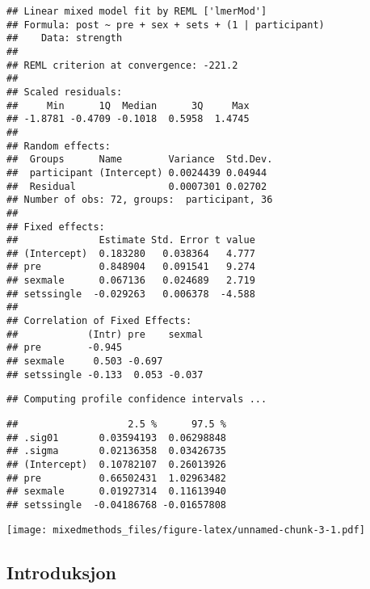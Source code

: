\documentclass[
]{article}
\begin{document}
\begin{verbatim}
## Linear mixed model fit by REML ['lmerMod']
## Formula: post ~ pre + sex + sets + (1 | participant)
##    Data: strength
## 
## REML criterion at convergence: -221.2
## 
## Scaled residuals: 
##     Min      1Q  Median      3Q     Max 
## -1.8781 -0.4709 -0.1018  0.5958  1.4745 
## 
## Random effects:
##  Groups      Name        Variance  Std.Dev.
##  participant (Intercept) 0.0024439 0.04944 
##  Residual                0.0007301 0.02702 
## Number of obs: 72, groups:  participant, 36
## 
## Fixed effects:
##              Estimate Std. Error t value
## (Intercept)  0.183280   0.038364   4.777
## pre          0.848904   0.091541   9.274
## sexmale      0.067136   0.024689   2.719
## setssingle  -0.029263   0.006378  -4.588
## 
## Correlation of Fixed Effects:
##            (Intr) pre    sexmal
## pre        -0.945              
## sexmale     0.503 -0.697       
## setssingle -0.133  0.053 -0.037
\end{verbatim}

\begin{verbatim}
## Computing profile confidence intervals ...
\end{verbatim}

\begin{verbatim}
##                   2.5 %      97.5 %
## .sig01       0.03594193  0.06298848
## .sigma       0.02136358  0.03426735
## (Intercept)  0.10782107  0.26013926
## pre          0.66502431  1.02963482
## sexmale      0.01927314  0.11613940
## setssingle  -0.04186768 -0.01657808
\end{verbatim}

\texttt{[image: mixedmethods\_files/figure-latex/unnamed-chunk-3-1.pdf]}

\hypertarget{introduksjon}{%
\subsection{Introduksjon}\label{introduksjon}}
\end{document}
